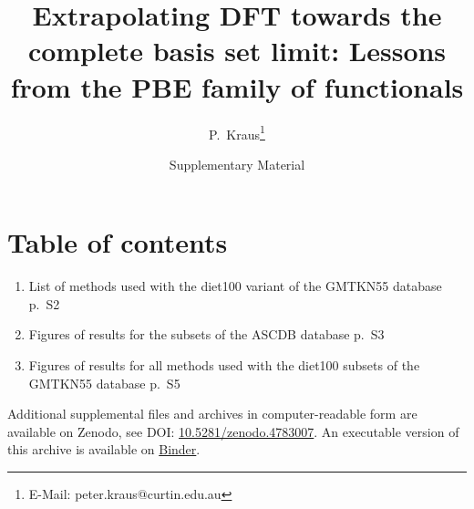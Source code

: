 \documentclass[12pt]{article}
\newcommand{\beginsupplement}{%
        \setcounter{table}{0}
        \renewcommand{\thetable}{S\arabic{table}}%
        \setcounter{figure}{0}
        \renewcommand{\thefigure}{S\arabic{figure}}%
        \renewcommand{\thepage}{S\arabic{page}}%
     }
\begin{document}
\title{Extrapolating DFT towards the complete basis set limit: Lessons from the PBE family of functionals}

\date{Supplementary Material}

\author{P.~Kraus\thanks{E-Mail: peter.kraus@curtin.edu.au}}

\maketitle




\beginsupplement

\section*{Table of contents}
\begin{enumerate}
	\item List of methods used with the diet100 variant of the GMTKN55 database \hfill p.~S2
	\item Figures of results for the subsets of the ASCDB database \hfill p.~S3
    \item Figures of results for all methods used with the diet100 subsets of the GMTKN55 database \hfill p.~S5
\end{enumerate}

Additional supplemental files and archives in computer-readable form are available on Zenodo, see DOI: \href{http://dx.doi.org/10.5281/zenodo.4783007}{10.5281/zenodo.4783007}. An executable version of this archive is available on \href{https://mybinder.org/v2/zenodo/10.5281/zenodo.4783007/?filepath=index.ipynb}{Binder}.
\end{document}
